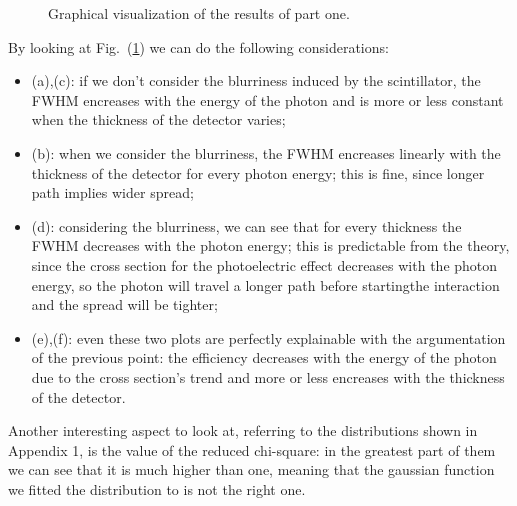 \documentclass[a4paper]{article}
\begin{document}
\begin{figure}[!htb]
  \quad
  \caption{Graphical visualization of the results of part one.}
  \label{fig:results_one}
\end{figure}
By looking at Fig.~(\ref{fig:results_one}) we can do the following considerations:
\begin{itemize}
  \item (a),(c): if we don't consider the blurriness induced by the scintillator, the FWHM encreases with the energy of the photon and is more or less constant when the thickness of the detector varies;
  \item (b): when we consider the blurriness, the FWHM encreases linearly with the thickness of the detector for every photon energy; this is fine, since longer path implies wider spread;
  \item (d): considering the blurriness, we can see that for every thickness the FWHM decreases with the photon energy; this is predictable from the theory, since the cross section for the photoelectric effect decreases with the photon energy, so the photon will travel a longer path before startingthe interaction and the spread will be tighter;
  \item (e),(f): even these two plots are perfectly explainable with the argumentation of the previous point: the efficiency decreases with the energy of the photon due to the cross section's trend and more or less encreases with the thickness of the detector.
\end{itemize}
Another interesting aspect to look at, referring to the distributions shown in Appendix 1, is the value of the reduced chi-square: in the greatest part of them we can see that it is much higher than one, meaning that the gaussian function we fitted the distribution to is not the right one.
\end{document}
